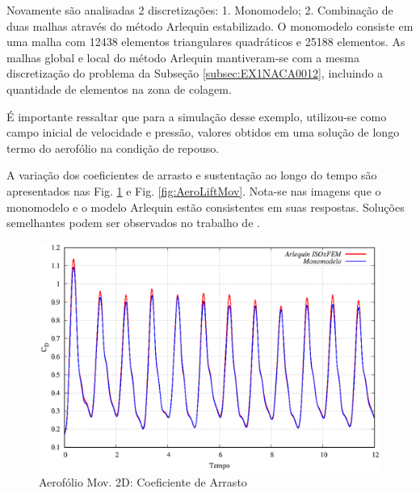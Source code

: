 \documentclass[tese_patricia]{subfiles}
\begin{document}
Novamente são analisadas 2 discretizações: 1. Monomodelo; 2. Combinação de duas malhas através do método Arlequin estabilizado.
O monomodelo consiste em uma malha com 12438 elementos triangulares quadráticos e 25188 elementos. As malhas global e local do método Arlequin mantiveram-se com a mesma discretização do problema da Subseção \ref{subsec:EX1NACA0012}, incluindo a quantidade de elementos na zona de colagem.

É importante ressaltar que para a simulação desse exemplo, utilizou-se como campo inicial de velocidade e pressão, valores obtidos em uma solução de longo termo do aerofólio na condição de repouso.

A variação dos coeficientes de arrasto e sustentação ao longo do tempo são apresentados nas Fig. \ref{fig:AeroDragMov} e Fig. \ref{fig:AeroLiftMov}. Nota-se nas imagens que o monomodelo e o modelo Arlequin estão consistentes em suas respostas. Soluções semelhantes podem ser observados no trabalho de .

\begin{figure}[htb!]
	\centering 
	\includegraphics[scale=1.0,trim=0cm 0cm 0cm 0cm, clip=true]{Imagens/Cap6/DragMov.eps}	
	\caption{Aerofólio Mov. 2D: Coeficiente de Arrasto}
	\label{fig:AeroDragMov}
\end{figure}
\end{document}
